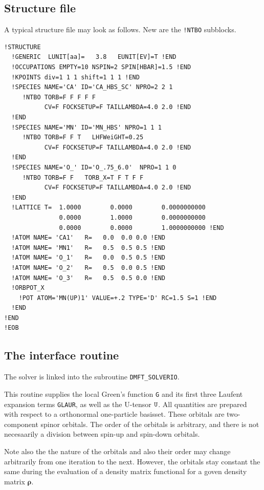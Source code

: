\documentclass[11pt,a4paper]{report}
\newcommand{\mat}[1]{\bm{#1}}  %
\begin{document}
\subsection{Structure file}
A typical structure file may look as follows. New are the \verb|!NTBO|
subblocks.
\begin{verbatim}
!STRUCTURE 
  !GENERIC  LUNIT[aa]=   3.8   EUNIT[EV]=T !END
  !OCCUPATIONS EMPTY=10 NSPIN=2 SPIN[HBAR]=1.5 !END
  !KPOINTS div=1 1 1 shift=1 1 1 !END
  !SPECIES NAME='CA' ID='CA_HBS_SC' NPRO=2 2 1 
     !NTBO TORB=F F F F F  
           CV=F FOCKSETUP=F TAILLAMBDA=4.0 2.0 !END 
  !END
  !SPECIES NAME='MN' ID='MN_HBS' NPRO=1 1 1 
     !NTBO TORB=F F T   LHFWeiGHT=0.25
           CV=F FOCKSETUP=F TAILLAMBDA=4.0 2.0 !END 
  !END
  !SPECIES NAME='O_' ID='O_.75_6.0'  NPRO=1 1 0
     !NTBO TORB=F F   TORB_X=T F T F F   
           CV=F FOCKSETUP=F TAILLAMBDA=4.0 2.0 !END 
  !END
  !LATTICE T=  1.0000        0.0000        0.0000000000
               0.0000        1.0000        0.0000000000
               0.0000        0.0000        1.0000000000 !END
  !ATOM NAME= 'CA1'   R=   0.0  0.0 0.0 !END
  !ATOM NAME= 'MN1'   R=   0.5  0.5 0.5 !END
  !ATOM NAME= 'O_1'   R=   0.0  0.5 0.5 !END
  !ATOM NAME= 'O_2'   R=   0.5  0.0 0.5 !END
  !ATOM NAME= 'O_3'   R=   0.5  0.5 0.0 !END
  !ORBPOT_X
    !POT ATOM='MN(UP)1' VALUE=+.2 TYPE='D' RC=1.5 S=1 !END
  !END
!END 
!EOB
\end{verbatim}

\subsection{The interface routine}
The solver is linked into the subroutine \verb|DMFT_SOLVERIO|.

This routine supplies the local Green's function \verb|G| and its
first three Laufent expansion terms \verb|GLAUR|, as well as the
U-tensor $\verb|U|$. All quantities are prepared with respect to a
orthonormal one-particle basisset. These orbitals are two-component
spinor orbitals. The order of the orbitals is arbitrary, and there is
not necesaarily a division between spin-up and spin-down orbitals.

Note also the the nature of the orbitals and also their order may
change arbitrarily from one iteration to the next. However, the
orbitals stay constant the same during the evaluation of a density
matrix functional for a goven density matrix $\mat{\rho}$.
\end{document}
